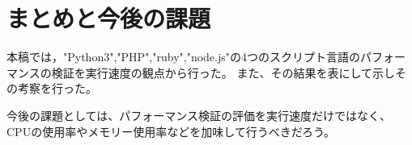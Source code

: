 \chapter{まとめと今後の課題}
\label{cha:conclusion}

 本稿では，"Python3","PHP","ruby","node.js"の4つのスクリプト言語のパフォーマンスの検証を実行速度の観点から行った。
 また、その結果を表にして示しその考察を行った。

 今後の課題としては、パフォーマンス検証の評価を実行速度だけではなく、CPUの使用率やメモリー使用率などを加味して行うべきだろう。